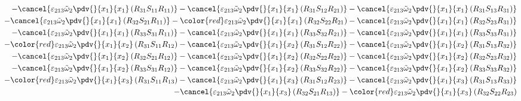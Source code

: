 \begin{equation}
	\begin{split}
		-\cancel{\varepsilon_{213}\tilde{\omega}_{2}\pdv{}{x_{1}}{x_{1}}\left(R_{31}S_{11}R_{11}\right)}
		-\cancel{\varepsilon_{213}\tilde{\omega}_{2}\pdv{}{x_{1}}{x_{1}}\left(R_{31}S_{12}R_{21}\right)}
		-\cancel{\varepsilon_{213}\tilde{\omega}_{2}\pdv{}{x_{1}}{x_{1}}\left(R_{31}S_{13}R_{31}\right)}\\
		-\cancel{\varepsilon_{213}\tilde{\omega}_{2}\pdv{}{x_{1}}{x_{1}}\left(R_{32}S_{21}R_{11}\right)}
		-{\color{red}\varepsilon_{213}\tilde{\omega}_{2}\pdv{}{x_{1}}{x_{1}}\left(R_{32}S_{22}R_{21}\right)}
		-\cancel{\varepsilon_{213}\tilde{\omega}_{2}\pdv{}{x_{1}}{x_{1}}\left(R_{32}S_{23}R_{31}\right)}\\
		-\cancel{\varepsilon_{213}\tilde{\omega}_{2}\pdv{}{x_{1}}{x_{1}}\left(R_{33}S_{31}R_{11}\right)}
		-\cancel{\varepsilon_{213}\tilde{\omega}_{2}\pdv{}{x_{1}}{x_{1}}\left(R_{33}S_{32}R_{21}\right)}
		-\cancel{\varepsilon_{213}\tilde{\omega}_{2}\pdv{}{x_{1}}{x_{1}}\left(R_{33}S_{33}R_{31}\right)}\\
		-{\color{red}\varepsilon_{213}\tilde{\omega}_{2}\pdv{}{x_{1}}{x_{2}}\left(R_{31}S_{11}R_{12}\right)}
		-\cancel{\varepsilon_{213}\tilde{\omega}_{2}\pdv{}{x_{1}}{x_{2}}\left(R_{31}S_{12}R_{22}\right)}
		-\cancel{\varepsilon_{213}\tilde{\omega}_{2}\pdv{}{x_{1}}{x_{2}}\left(R_{31}S_{13}R_{32}\right)}\\
		-\cancel{\varepsilon_{213}\tilde{\omega}_{2}\pdv{}{x_{1}}{x_{2}}\left(R_{32}S_{21}R_{12}\right)}
		-\cancel{\varepsilon_{213}\tilde{\omega}_{2}\pdv{}{x_{1}}{x_{2}}\left(R_{32}S_{22}R_{22}\right)}
		-\cancel{\varepsilon_{213}\tilde{\omega}_{2}\pdv{}{x_{1}}{x_{2}}\left(R_{32}S_{23}R_{32}\right)}\\
		-\cancel{\varepsilon_{213}\tilde{\omega}_{2}\pdv{}{x_{1}}{x_{2}}\left(R_{33}S_{31}R_{12}\right)}
		-\cancel{\varepsilon_{213}\tilde{\omega}_{2}\pdv{}{x_{1}}{x_{2}}\left(R_{33}S_{32}R_{22}\right)}
		-\cancel{\varepsilon_{213}\tilde{\omega}_{2}\pdv{}{x_{1}}{x_{2}}\left(R_{33}S_{33}R_{32}\right)}\\
		-{\color{red}\varepsilon_{213}\tilde{\omega}_{2}\pdv{}{x_{1}}{x_{3}}\left(R_{31}S_{11}R_{13}\right)}
		-\cancel{\varepsilon_{213}\tilde{\omega}_{2}\pdv{}{x_{1}}{x_{3}}\left(R_{31}S_{12}R_{23}\right)}
		-\cancel{\varepsilon_{213}\tilde{\omega}_{2}\pdv{}{x_{1}}{x_{3}}\left(R_{31}S_{13}R_{33}\right)}\\
		-\cancel{\varepsilon_{213}\tilde{\omega}_{2}\pdv{}{x_{1}}{x_{3}}\left(R_{32}S_{21}R_{13}\right)}
		-{\color{red}\varepsilon_{213}\tilde{\omega}_{2}\pdv{}{x_{1}}{x_{3}}\left(R_{32}S_{22}R_{23}\right)}

\end{split}
\end{equation}
